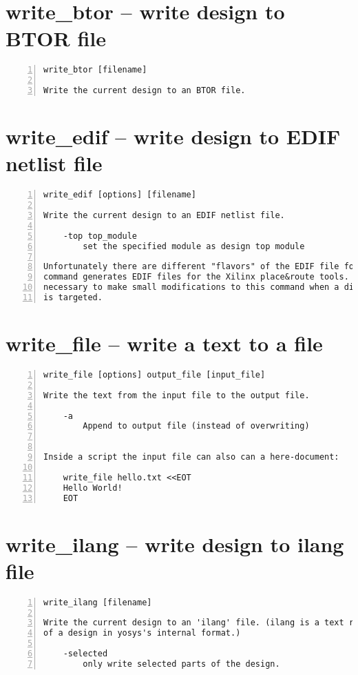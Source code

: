 \section{write\_btor -- write design to BTOR file}
\label{cmd:write_btor}
\begin{lstlisting}[numbers=left,frame=single]
    write_btor [filename]

Write the current design to an BTOR file.
\end{lstlisting}

\section{write\_edif -- write design to EDIF netlist file}
\label{cmd:write_edif}
\begin{lstlisting}[numbers=left,frame=single]
    write_edif [options] [filename]

Write the current design to an EDIF netlist file.

    -top top_module
        set the specified module as design top module

Unfortunately there are different "flavors" of the EDIF file format. This
command generates EDIF files for the Xilinx place&route tools. It might be
necessary to make small modifications to this command when a different tool
is targeted.
\end{lstlisting}

\section{write\_file -- write a text to a file}
\label{cmd:write_file}
\begin{lstlisting}[numbers=left,frame=single]
    write_file [options] output_file [input_file]

Write the text from the input file to the output file.

    -a
        Append to output file (instead of overwriting)


Inside a script the input file can also can a here-document:

    write_file hello.txt <<EOT
    Hello World!
    EOT
\end{lstlisting}

\section{write\_ilang -- write design to ilang file}
\label{cmd:write_ilang}
\begin{lstlisting}[numbers=left,frame=single]
    write_ilang [filename]

Write the current design to an 'ilang' file. (ilang is a text representation
of a design in yosys's internal format.)

    -selected
        only write selected parts of the design.
\end{lstlisting}

